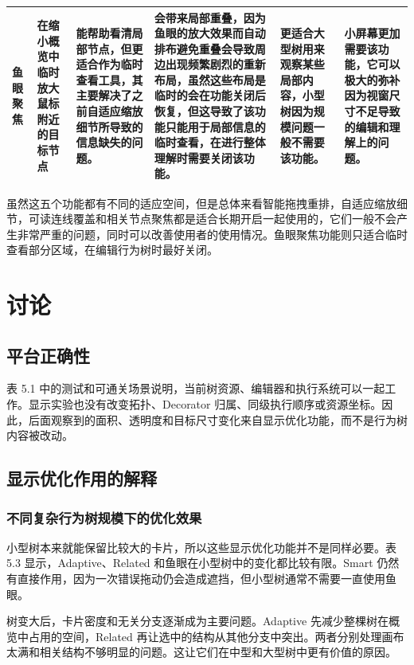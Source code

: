 \documentclass[11pt,a4paper,oneside,extrafontsizes]{memoir}
\begin{document}
\begin{center}
\begin{longtable}{@{}p{} p{} p{} p{} p{} p{}@{}}
鱼眼聚焦 & 在缩小概览中临时放大鼠标附近的目标节点 & 能帮助看清局部节点，但更适合作为临时查看工具，其主要解决了之前自适应缩放细节所导致的信息缺失的问题。 & 会带来局部重叠，因为鱼眼的放大效果而自动排布避免重叠会导致周边出现频繁剧烈的重新布局，虽然这些布局是临时的会在功能关闭后恢复，但这导致了该功能只能用于局部信息的临时查看，在进行整体理解时需要关闭该功能。 & 更适合大型树用来观察某些局部内容，小型树因为规模问题一般不需要该功能。 & 小屏幕更加需要该功能，它可以极大的弥补因为视窗尺寸不足导致的编辑和理解上的问题。 \\
\bottomrule
\end{longtable}
\end{center}

虽然这五个功能都有不同的适应空间，但是总体来看智能拖拽重排，自适应缩放细节，可读连线覆盖和相关节点聚焦都是适合长期开启一起使用的，它们一般不会产生非常严重的问题，同时可以改善使用者的使用情况。鱼眼聚焦功能则只适合临时查看部分区域，在编辑行为树时最好关闭。

\chapter{讨论}

\section{平台正确性}
表 5.1 中的测试和可通关场景说明，当前树资源、编辑器和执行系统可以一起工作。显示实验也没有改变拓扑、Decorator 归属、同级执行顺序或资源坐标。因此，后面观察到的面积、透明度和目标尺寸变化来自显示优化功能，而不是行为树内容被改动。

\section{显示优化作用的解释}

\subsection{不同复杂行为树规模下的优化效果}

小型树本来就能保留比较大的卡片，所以这些显示优化功能并不是同样必要。表 5.3 显示，Adaptive、Related 和鱼眼在小型树中的变化都比较有限。Smart 仍然有直接作用，因为一次错误拖动仍会造成遮挡，但小型树通常不需要一直使用鱼眼。

树变大后，卡片密度和无关分支逐渐成为主要问题。Adaptive 先减少整棵树在概览中占用的空间，Related 再让选中的结构从其他分支中突出。两者分别处理画布太满和相关结构不够明显的问题。这让它们在中型和大型树中更有价值的原因。
\end{document}
